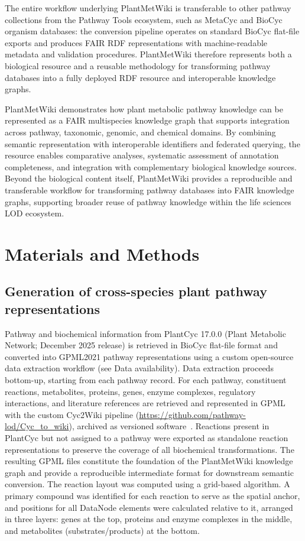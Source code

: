 \documentclass[11pt,a4paper]{article}
\begin{document}
The entire workflow underlying PlantMetWiki is transferable to other pathway collections from the
Pathway Tools ecosystem, such as MetaCyc and BioCyc organism databases: the conversion pipeline
operates on standard BioCyc flat-file exports and produces FAIR RDF representations with
machine-readable metadata and validation procedures. PlantMetWiki therefore represents both a
biological resource and a reusable methodology for transforming pathway databases into a fully
deployed RDF resource and interoperable knowledge graphs.

PlantMetWiki demonstrates how plant metabolic pathway knowledge can be represented as a FAIR
multispecies knowledge graph that supports integration across pathway, taxonomic, genomic, and
chemical domains. By combining semantic representation with interoperable identifiers and federated
querying, the resource enables comparative analyses, systematic assessment of annotation
completeness, and integration with complementary biological knowledge sources. Beyond the biological
content itself, PlantMetWiki provides a reproducible and transferable workflow for transforming
pathway databases into FAIR knowledge graphs, supporting broader reuse of pathway knowledge within
the life sciences LOD ecosystem.

\section*{Materials and Methods}

\subsection*{Generation of cross-species plant pathway representations}
Pathway and biochemical information from PlantCyc 17.0.0 (Plant Metabolic Network; December 2025
release) is retrieved in BioCyc flat-file format and converted into GPML2021 pathway representations
using a custom open-source data extraction workflow (see Data availability). Data extraction proceeds
bottom-up, starting from each pathway record. For each pathway, constituent reactions, metabolites,
proteins, genes, enzyme complexes, regulatory interactions, and literature references are retrieved
and represented in GPML with the custom Cyc2Wiki pipeline
(\url{https://github.com/pathway-lod/Cyc_to_wiki}), archived as versioned
software~\cite{delpup2026cyc2wiki}. Reactions present in PlantCyc but not assigned to
a pathway were exported as standalone reaction representations to preserve the coverage of all
biochemical transformations. The resulting GPML files constitute the foundation of the PlantMetWiki
knowledge graph and provide a reproducible intermediate format for downstream semantic conversion. The
reaction layout was computed using a grid-based algorithm. A primary compound was identified for each
reaction to serve as the spatial anchor, and positions for all DataNode elements were calculated
relative to it, arranged in three layers: genes at the top, proteins and enzyme complexes in the
middle, and metabolites (substrates/products) at the bottom.
\end{document}
